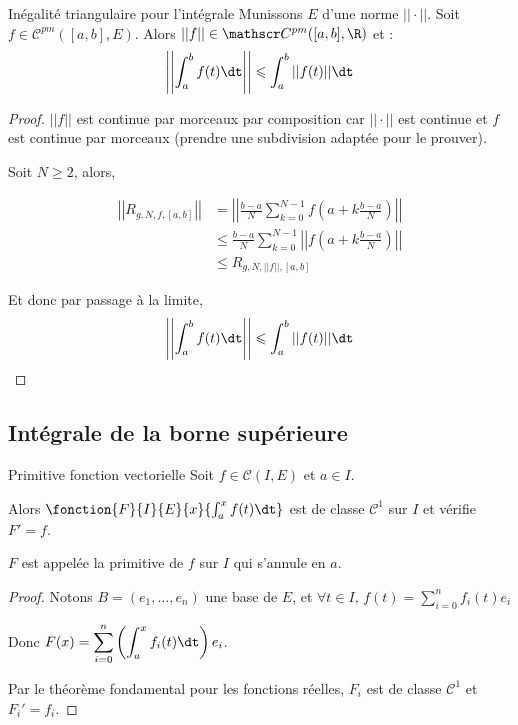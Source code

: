 \begin{theoreme}{Inégalité triangulaire pour l'intégrale}{}
    Munissons $E$ d'une norme $||\cdot||$. Soit $f \in \mathscr C^{pm}([a, b], E)$.
    Alors $||f|| \in \mathscr C^{pm}([a, b], \R)$ et :
    \[\left|\left| \int_a^b f(t) \dt \right|\right| \leqslant \int_a^b ||f(t)|| \dt\]
\end{theoreme}


\begin{proof}
    $||f||$ est continue par morceaux par composition car $||\cdot||$ est continue
    et $f$ est continue par morceaux (prendre une subdivision adaptée pour le prouver).

    Soit $N \geqslant 2$, alors,

    \begin{align*}
        \left|\left| R_{g, N, f, [a, b]} \right|\right| & = \left|\left| \frac{b-a}{N} \sum_{k=0}^{N-1} f\left( a + k \frac{b-a}{N} \right) \right|\right| \\
        & \leqslant \frac{b-a}{N} \sum_{k=0}^{N-1} \left|\left| f\left( a + k \frac{b-a}{N} \right) \right|\right| \\
        & \leqslant R_{g, N, ||f||, [a, b]}
    \end{align*}

    Et donc par passage à la limite, 
    \[\left|\left| \int_a^b f(t) \dt \right|\right| \leqslant \int_a^b ||f(t)|| \dt\]
\end{proof}

\subsection{Intégrale de la borne supérieure}

\begin{theoreme}{Primitive fonction vectorielle}{}
    Soit $f \in \mathscr C(I, E)$ et $a \in I$. 

    Alors $\fonction{F}{I}{E}{x}{\int_a^x f(t) \dt}$ est de classe $\mathscr C^1$ sur $I$ et 
    vérifie $F' = f$.

    $F$ est appelée la primitive de $f$ sur $I$ qui s'annule en $a$. 
\end{theoreme}


\begin{proof}
    Notons $B = (e_1, \ldots, e_n)$ une base de $E$, et $\forall t \in I, \, f(t) \displaystyle = \sum_{i = 0 }^{ n } f_i(t) e_i$

    Donc $\displaystyle F(x) = \sum_{i = 0 }^{ n } \left( \int_a^x f_i(t) \dt \right) e_i$.

    Par le théorème fondamental pour les fonctions réelles, $F_i$ est de classe $\mathscr C^1$ et $F_i' = f_i$.
\end{proof}

